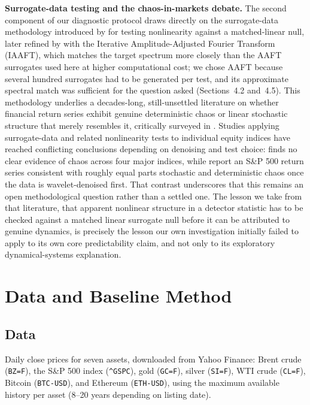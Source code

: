 \documentclass[preprint,12pt]{elsarticle}
\begin{document}
\textbf{Surrogate-data testing and the chaos-in-markets debate.} The second component of our
diagnostic protocol draws directly on the surrogate-data methodology introduced by
\citet{theiler1992} for testing nonlinearity against a matched-linear null, later refined by
\citet{schreiber1996,schreiber2000} with the Iterative Amplitude-Adjusted Fourier Transform
(IAAFT), which matches the target spectrum more closely than the AAFT surrogates used here at
higher computational cost; we chose AAFT because several hundred surrogates had to be
generated per test, and its approximate spectral match was sufficient for the question asked
(Sections~4.2 and~4.5). This methodology underlies
a decades-long, still-unsettled literature on whether financial return series exhibit genuine
deterministic chaos or linear stochastic structure that merely resembles it, critically
surveyed in \citet{barnett2000}. Studies applying surrogate-data and related nonlinearity tests
to individual equity indices have reached conflicting conclusions depending on denoising and
test choice: \citet{inglada2020} finds no clear evidence of chaos across four major indices,
while \citet{vogl2022} report an S\&P 500 return series consistent with roughly equal parts
stochastic and deterministic chaos once the data is wavelet-denoised first. That contrast
underscores that this remains an open methodological question rather than a settled one. The
lesson we take from that literature, that apparent nonlinear structure in a
detector statistic has to be checked against a matched linear surrogate null before it can be
attributed to genuine dynamics, is precisely the lesson our own investigation initially failed
to apply to its own core predictability claim, and not only to its exploratory
dynamical-systems explanation.

\section{Data and Baseline Method}

\subsection{Data}
Daily close prices for seven assets, downloaded from Yahoo Finance: Brent crude (\texttt{BZ=F}),
the S\&P 500 index (\texttt{\textasciicircum GSPC}), gold (\texttt{GC=F}), silver (\texttt{SI=F}), WTI crude
(\texttt{CL=F}), Bitcoin (\texttt{BTC-USD}), and Ethereum (\texttt{ETH-USD}), using the maximum
available history per asset (8--20 years depending on listing date).
\end{document}
